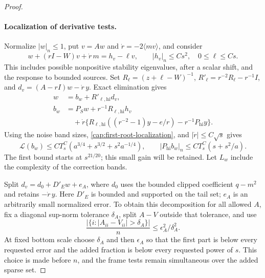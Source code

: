 \begin{proof}
\paragraph{Localization of derivative tests.}
Normalize $|w|_n\le1$, put $v=Aw$ and
$\dot r=-2\langle mv\rangle$, and consider
\begin{equation}\label{cap:derivative-equation}
 w+(rI-W)v+\dot r\,m=h_v-\ell v,
 \qquad |h_v|_n\le Cs^2,\quad 0\le\ell\le Cs.
\end{equation}
This includes possible nonpositive stability eigenvalues, after a scalar
shift, and the response to bounded sources. Set $R_\ell=(z+\ell-W)^{-1}$,
$R'_\ell=r^{-2}R_\ell-r^{-1}I$, and $d_v=(A-rI)w-\dot r\,y$. Exact elimination
gives
\begin{equation}\label{cap:derivative-band-equation}
 \begin{split}
 w&=b_w+R'_{\ell,\mathrm{hi}}d_v,\\
 b_w&=P_Sw+r^{-1}R_{\ell,\mathrm{hi}}h_v\\
 &\quad+\dot r\{R_{\ell,\mathrm{hi}}((r^{-2}-1)y-e/r)
                                    -r^{-1}P_{\mathrm{hi}}y\}.
 \end{split}
\end{equation}
Using the noise band sizes, \eqref{cap:first-root-localization}, and
$|\dot r|\le C\sqrt s$ gives
\[
 \mathscr L(b_w)\le CT_s^C
           (a^{3/4}+s^{3/2}+s^2a^{-1/4}),
 \qquad |P_{\mathrm{hi}}b_w|_n
        \le CT_s^C(s+s^2/a).
\]
The first bound starts at $s^{21/20}$; this small gain will be retained.
Let $L_w$ include the complexity of the correction bands.

Split $d_v=d_0+D'_Ew+e_A$, where $d_0$ uses the bounded clipped coefficient
$q-m^2$ and retains $-\dot r\,y$. Here $D'_E$ is bounded and supported on the
tail set; $e_A$ is an arbitrarily small normalized error. To obtain this
decomposition for all allowed $A$, fix a diagonal sup-norm tolerance
$\delta_A$, split $A-V$ outside that tolerance, and use
\[
 \frac{|\{i:|A_{ii}-V_{ii}|>\delta_A\}|}{n}
 \le\epsilon_A^2/\delta_A^2.
\]
At fixed bottom scale choose $\delta_A$ and then $\epsilon_A$ so that the
first part is below every requested error and the added fraction is below
every requested power of $s$. This choice is made before $n$, and the frame
tests remain simultaneous over the added sparse set.


\end{proof}

